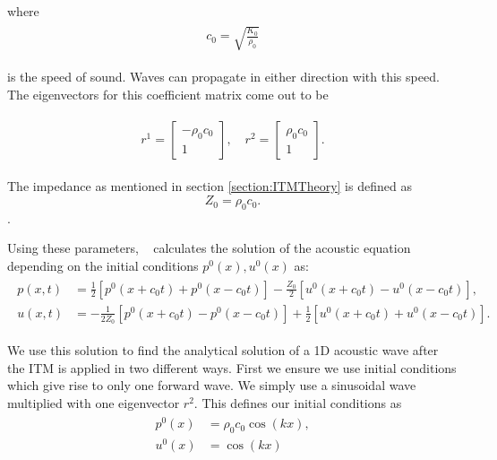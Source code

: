 where 
\begin{align}
    \begin{split}
        c_0 = \sqrt{\frac{K_0}{\rho_0}}
    \end{split}
\end{align}

is the speed of sound. Waves can propagate in either direction with this speed. The eigenvectors for this coefficient matrix come out to be

\begin{align}
    \begin{split}
        r^1 = \begin{bmatrix}
            -\rho_0 c_0 \\
            1
        \end{bmatrix}, \quad
        r^2 = \begin{bmatrix}
            \rho_0 c_0 \\
            1
        \end{bmatrix}.
    \end{split}
\end{align}

The impedance as mentioned in section \ref{section:ITMTheory} is defined as
\begin{equation}
    Z_0 = \rho_0 c_0.
\end{equation}.

Using these parameters, ~\parencite[Sec. 2.8]{leveque_2002} calculates the solution of the acoustic equation depending on the initial conditions $p^0(x), u^0(x)$ as:
\begin{align}
    \begin{split}
        p(x,t) &= \frac{1}{2}\left[p^0\left(x + c_0t\right) + p^0\left(x - c_0t\right)\right] - \frac{Z_0}{2}\left[u^0\left(x+c_0t\right) - u^0\left(x-c_0t\right)\right], \\
        u(x,t) &= -\frac{1}{2Z_0}\left[p^0\left(x+c_0t\right) - p^0\left(x-c_0t\right)\right] + \frac{1}{2}\left[u^0\left(x+c_0t\right) + u^0\left(x-c_0t\right)\right] .
    \end{split}
    \label{eq:solutionacoustic}
\end{align}

We use this solution to find the analytical solution of a 1D acoustic wave after the \ac{ITM} is applied in two different ways. First we ensure we use initial conditions which give rise to only one forward wave. We simply use a sinusoidal wave multiplied with one eigenvector $r^2$.
This defines our initial conditions as
\begin{align}
    \begin{split}
        p^0\left(x\right) &= \rho_0c_0 \cos\left(kx\right), \\
        u^0\left(x\right) &= \cos\left(kx\right)
    \end{split}
    \label{eq:initialconditions}
\end{align}

